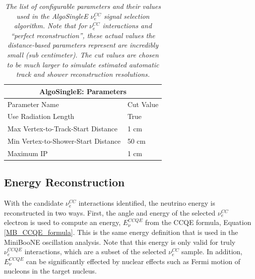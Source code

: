 \begin{table}
\begin{tabular}{ |p{8 cm}|p{1.5 cm}|  }
 \hline
 \multicolumn{2}{|c|}{AlgoSingleE: Parameters} \\
 \hline
 Parameter Name &  Cut Value \\
 \hline \hline
 Use Radiation Length &  True\\\hline
 
 Max Vertex-to-Track-Start Distance & 1 cm \\\hline

 Min Vertex-to-Shower-Start Distance & 50 cm \\\hline

 Maximum IP & 1 cm \\\hline

 \hline
\end{tabular}
\caption{\textit{The list of configurable parameters and their values used in the AlgoSingleE $\nu_e^{CC}$ signal selection algorithm. Note that for $\nu_e^{CC}$ interactions and ``perfect reconstruction'', these actual values the distance-based parameters represent are incredibly small (sub centimeter). The cut values are chosen to be much larger to simulate estimated automatic track and shower reconstruction resolutions.}}\label{algosinglee_table}
\end{table}










\subsection{Energy Reconstruction}\label{LEE_EnergyReco_section}

With the candidate $\nu_e^{CC}$ interactions identified, the neutrino energy is reconstructed in two ways. First, the angle and energy of the selected $\nu_e^{CC}$ electron is used to compute an energy, $E_\nu^{CCQE}$ from the CCQE formula, Equation \ref{MB_CCQE_formula}. This is the same energy definition that is used in the MiniBooNE oscillation analysis. Note that this energy is only valid for truly $\nu_e^{CCQE}$ interactions, which are a subset of the selected $\nu_e^{CC}$ sample. In addition, $E_\nu^{CCQE}$ can be significantly effected by nuclear effects such as Fermi motion of nucleons in the target nucleus.\\

